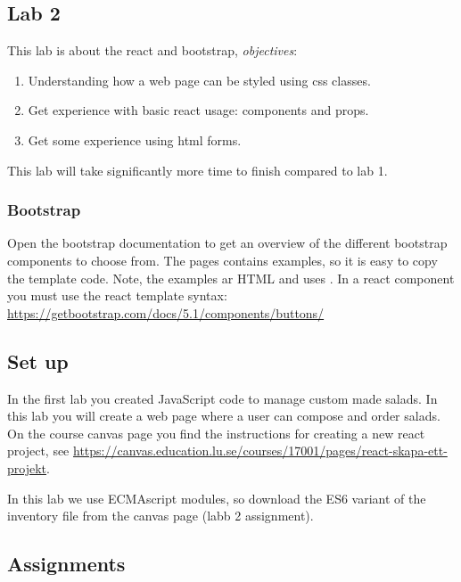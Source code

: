 \documentclass[fleqn, article, a4paper]{memoir}
\begin{document}
\maketitle
\thispagestyle{titlepage}
\vspace{-4cm}

\subsection*{Lab 2}

\n This lab is about the react and bootstrap, \emph{objectives}:

\begin{enumerate}\firmlist
\item Understanding how a web page can be styled using css classes.
\item Get experience with basic react usage: components and props.
\item Get some experience using html forms.
\end{enumerate}
\noindent This lab will take significantly more time to finish compared to lab 1.
\subsubsection*{Bootstrap}
Open the bootstrap documentation to get an overview of the different bootstrap components to choose from. The pages contains examples, so it is easy to copy the template code. Note, the examples ar HTML and uses . In a react component you must use the react template syntax:
\\ \url{https://getbootstrap.com/docs/5.1/components/buttons/}

\subsection*{Set up}

In the first lab you created JavaScript code to manage custom made salads. In this lab you will create a web page where a user can compose and order salads. On the course canvas page you find the instructions for creating a new react project, see \url{https://canvas.education.lu.se/courses/17001/pages/react-skapa-ett-projekt}.

In this lab we use ECMAscript modules, so download the ES6 variant of the inventory file from the canvas page (labb 2 assignment).
\subsection*{Assignments}
\end{document}
